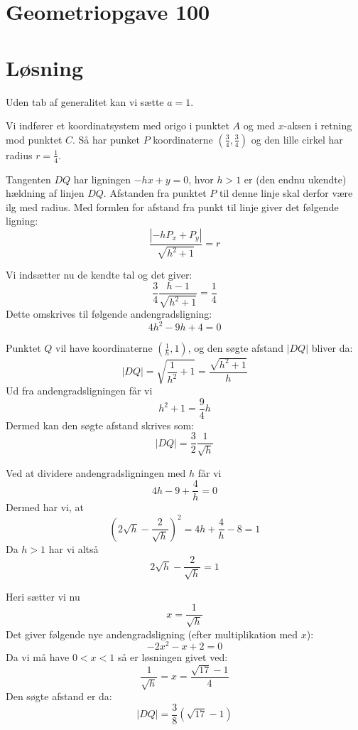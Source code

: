 \documentclass[12pt,oneside,a4paper]{article}
\begin{document}
\section{Geometriopgave 100}

\section{Løsning}
Uden tab af generalitet kan vi sætte $a=1$.

Vi indfører et koordinatsystem med origo i punktet $A$ og med $x$-aksen i retning mod punktet $C$. Så har punket $P$ koordinaterne $(\frac 34, \frac 34)$ og den lille cirkel har radius $r=\frac 14$.

Tangenten $DQ$ har ligningen $-hx+y=0$, hvor $h>1$ er (den endnu ukendte) hældning af linjen $DQ$. Afstanden fra punktet $P$ til denne linje skal derfor være ilg med radius. Med formlen for afstand fra punkt til linje giver det følgende ligning:
$$
\frac{\left|-hP_x+P_y\right|}{\sqrt{h^2+1}} = r
$$

Vi indsætter nu de kendte tal og det giver:
$$
\frac 34 \frac{h-1}{\sqrt{h^2+1}} = \frac 14
$$
Dette omskrives til følgende andengradsligning:
$$
4h^2-9h+4=0
$$

Punktet $Q$ vil have koordinaterne $(\frac 1h, 1)$, og den søgte afstand $|DQ|$ bliver da:
$$
|DQ| = \sqrt{\frac{1}{h^2} + 1} = \frac{\sqrt{h^2+1}}{h}
$$
Ud fra andengradsligningen får vi
$$
h^2+1 = \frac 94 h
$$
Dermed kan den søgte afstand skrives som:
$$
|DQ| = \frac{3}{2} \frac{1}{\sqrt h}
$$

Ved at dividere andengradsligningen med $h$ får vi
$$
4h-9+\frac 4h=0
$$
Dermed har vi, at 
$$
\left(2\sqrt h - \frac{2}{\sqrt h}\right)^2 = 4h + \frac 4h - 8 = 1
$$
Da $h>1$ har vi altså
$$
2\sqrt h - \frac{2}{\sqrt h} = 1
$$

Heri sætter vi nu
$$
x= \frac{1}{\sqrt h}
$$
Det giver følgende nye andengradsligning (efter multiplikation med $x$):
$$
-2x^2-x+2=0
$$
Da vi må have $0<x<1$ så er løsningen givet ved:
$$
\frac{1}{\sqrt h} = x=\frac{\sqrt{17}-1}{4}
$$
Den søgte afstand er da:
$$
|DQ| = \frac{3}{8} \left(\sqrt{17}-1\right)
$$
\end{document}
